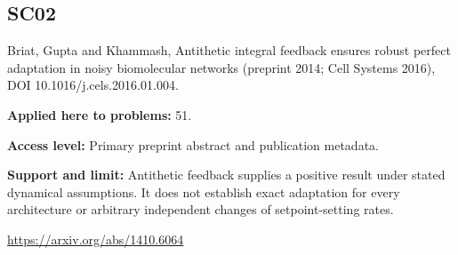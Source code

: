 \documentclass[11pt]{article}
\begin{document}
\subsection*{SC02}\label{check:SC02}

Briat, Gupta and Khammash, Antithetic integral feedback ensures robust perfect adaptation in noisy biomolecular networks (preprint 2014; Cell Systems 2016), DOI 10.1016/j.cels.2016.01.004.

\textbf{Applied here to problems:} 51.

\textbf{Access level:} Primary preprint abstract and publication metadata.

\textbf{Support and limit:} Antithetic feedback supplies a positive result under stated dynamical assumptions. It does not establish exact adaptation for every architecture or arbitrary independent changes of setpoint-setting rates.

\url{https://arxiv.org/abs/1410.6064}
\end{document}
